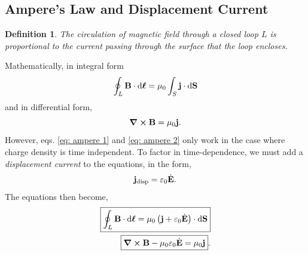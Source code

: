 \documentclass{book}
\newtheorem*{definition}{Definition}
\begin{document}
\subsection{Ampere's Law and Displacement Current}
\begin{definition}
	The circulation of magnetic field through a closed loop $L$  is proportional to the current passing through the surface that the loop encloses.
\end{definition}
Mathematically, in integral form
\begin{equation}
	\oint_L \vb{B}\cdot\dd{\vb*{\ell}} = \mu_0 \int_S \vb{j}\cdot\dd{\vb{S}} \label{eq: ampere 1}
\end{equation}
and in differential form,
\begin{equation}
	\curl{\vb{B}} =\mu_0 \vb{j}. \label{eq: ampere 2}
\end{equation}
However, eqs. \eqref{eq: ampere 1} and \eqref{eq: ampere 2} only work in the case where charge density is time independent. To factor in time-dependence, we must add a \textit{displacement current} to the equations, in the form,
\begin{equation}
	\vb{j}_{\text{disp}} = \varepsilon_0 \Dot{\vb{E}}.
\end{equation}
The equations then become,
\begin{align}
	\boxed{\oint_L \vb{B}\cdot\dd{\vb*{\ell}} = \mu_0 \left(\vb{j} + \varepsilon_0\Dot{\vb{E}}\right)\cdot\dd{\vb{S}}} \\
	\boxed{\curl{\vb{B}} - \mu_0\varepsilon_0\Dot{\vb{E}} = \mu_0\vb{j}}.
\end{align}
\end{document}
